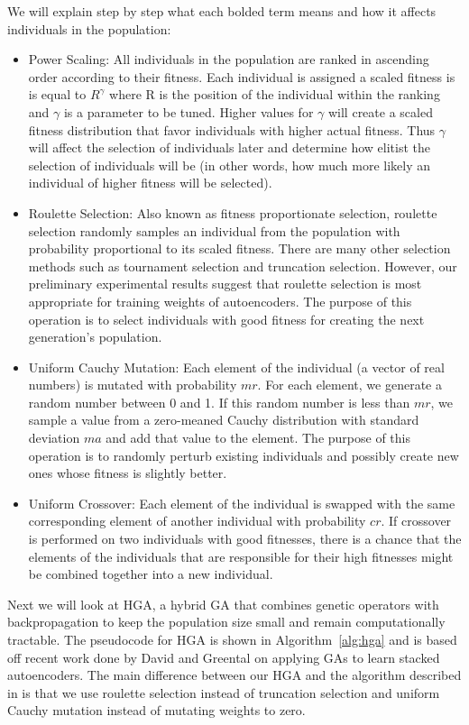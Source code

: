 We will explain step by step what each bolded term means and how it affects individuals in the population:

\begin{itemize}
  \item Power Scaling: All individuals in the population are ranked in ascending order according to their fitness. Each individual is assigned a scaled fitness is is equal to $R^{\gamma}$ where R is the position of the individual within the ranking and $\gamma$ is a parameter to be tuned. Higher values for $\gamma$ will create a scaled fitness distribution that favor individuals with higher actual fitness. Thus $\gamma$ will affect the selection of individuals later and determine how elitist the selection of individuals will be (in other words, how much more likely an individual of higher fitness will be selected).
  \item Roulette Selection: Also known as fitness proportionate selection, roulette selection randomly samples an individual from the population with probability proportional to its scaled fitness. There are many other selection methods such as tournament selection and truncation selection. However, our preliminary experimental results suggest that roulette selection is most appropriate for training weights of autoencoders. The purpose of this operation is to select individuals with good fitness for creating the next generation's population. 
  \item Uniform Cauchy Mutation: Each element of the individual (a vector of real numbers) is mutated with probability $mr$. For each element, we generate a random number between 0 and 1. If this random number is less than $mr$, we sample a value from a zero-meaned Cauchy distribution with standard deviation $ma$ and add that value to the element. The purpose of this operation is to randomly perturb existing individuals and possibly create new ones whose fitness is slightly better. 
  \item Uniform Crossover: Each element of the individual is swapped with the same corresponding element of another individual with probability $cr$. If crossover is performed on two individuals with good fitnesses, there is a chance that the elements of the individuals that are responsible for their high fitnesses might be combined together into a new individual. 
\end{itemize}

Next we will look at HGA, a hybrid GA that combines genetic operators with backpropagation to keep the population size small and remain computationally tractable. The pseudocode for HGA is shown in Algorithm~\ref{alg:hga} and is based off recent work done by David and Greental \cite{david2014genetic} on applying GAs to learn stacked autoencoders. The main difference between our HGA and the algorithm described in \cite{david2014genetic} is that we use roulette selection instead of truncation selection and uniform Cauchy mutation instead of mutating weights to zero.

